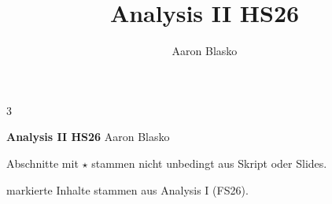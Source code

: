 \documentclass[8pt, a4paper]{extarticle}
\title{Analysis II HS26}
\author{Aaron Blasko}
\date{}
\newcommand{\oldkey}[1]{\textit{\color{blue}{#1}}}
\numberwithin{equation}{section}
\begin{document}
\begin{multicols*}{3}

    {\large \textbf{Analysis II HS26}}
    Aaron Blasko

    Abschnitte mit $\star$ stammen nicht unbedingt aus Skript oder Slides.

    \oldkey{Blau} markierte Inhalte stammen aus Analysis I (FS26).

    
    
    

\end{multicols*}

\pagebreak

\clearpage
\end{document}

